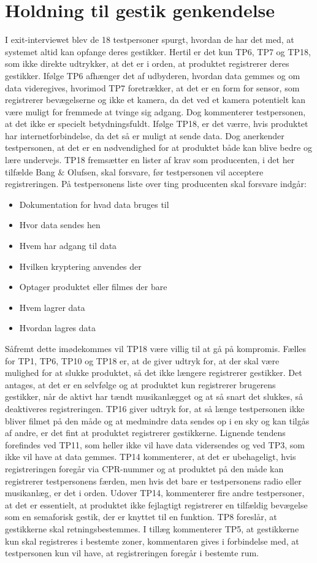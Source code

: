 \section{Holdning til gestik genkendelse}
\label{TestresultaterOvervaagning}
%
I exit-interviewet blev de 18 testpersoner spurgt, hvordan de har det med, at systemet altid kan opfange deres gestikker. Hertil er det kun TP6, TP7 og TP18, som ikke direkte udtrykker, at det er i orden, at produktet registrerer deres gestikker. Ifølge TP6 afhænger det af udbyderen, hvordan data gemmes og om data videregives, hvorimod TP7 foretrækker, at det er en form for sensor, som registrerer bevægelserne og ikke et kamera, da det ved et kamera potentielt kan være muligt for fremmede at tvinge sig adgang. Dog kommenterer testpersonen, at det ikke er specielt betydningsfuldt. Ifølge TP18, er det værre, hvis produktet har internetforbindelse, da det så er muligt at sende data. Dog anerkender testpersonen, at det er en nødvendighed for at produktet både kan blive bedre og lære undervejs. TP18 fremsætter en lister af krav som producenten, i det her tilfælde Bang $\&$ Olufsen, skal forsvare, før testpersonen vil acceptere registreringen. På testpersonens liste over ting producenten skal forsvare indgår:\blankline 
%
\begin{itemize}
  \item Dokumentation for hvad data bruges til
  \item Hvor data sendes hen
  \item Hvem har adgang til data
  \item Hvilken kryptering anvendes der
  \item Optager produktet eller filmes der bare
  \item Hvem lagrer data
  \item Hvordan lagres data\blankline
\end{itemize}
%
Såfremt dette imødekommes vil TP18 være villig til at gå på kompromis. Fælles for TP1, TP6, TP10 og TP18 er, at de giver udtryk for, at der skal være mulighed for at slukke produktet, så det ikke længere registrerer gestikker. Det antages, at det er en selvfølge og at produktet kun registrerer brugerens gestikker, når de aktivt har tændt musikanlægget og at så snart det slukkes, så deaktiveres registreringen. TP16 giver udtryk for, at så længe testpersonen ikke bliver filmet på den måde og at medmindre data sendes op i en sky og kan tilgås af andre, er det fint at produktet registrerer gestikkerne. Lignende tendens forefindes ved TP11, som heller ikke vil have data vidersendes og ved TP3, som ikke vil have at data gemmes. TP14 kommenterer, at det er ubehageligt, hvis registreringen foregår via CPR-nummer og at produktet på den måde kan registrerer testpersonens færden, men hvis det bare er testpersonens radio eller musikanlæg, er det i orden. Udover TP14, kommenterer fire andre testpersoner, at det er essentielt, at produktet ikke fejlagtigt registrerer en tilfældig bevægelse som en semaforisk gestik, der er knyttet til en funktion. TP8 foreslår, at gestikkerne skal retningsbestemmes. I tillæg kommenterer TP5, at gestikkerne kun skal registreres i bestemte zoner, kommentaren gives i forbindelse med, at testpersonen kun vil have, at registreringen foregår i bestemte rum.  

